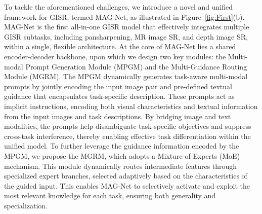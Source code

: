 \documentclass[lettersize,journal]{IEEEtran}
\begin{document}
 
To tackle the aforementioned challenges, we introduce a novel and unified framework for GISR, termed MAG-Net, as illustrated in Figure~\ref{fig:First}(b). MAG-Net is the first all-in-one GISR model that effectively integrates multiple GISR subtasks, including pansharpening, MR image SR, and depth image SR, within a single, flexible architecture.
At the core of MAG-Net lies a shared encoder-decoder backbone, upon which we design two key modules: the Multi-modal Prompt Generation Module (MPGM) and the Multi-Guidance Routing Module (MGRM).
The MPGM dynamically generates task-aware multi-modal prompts by jointly encoding the input image pair and pre-defined textual guidance that encapsulates task-specific description. These prompts act as implicit instructions, encoding both visual characteristics and textual information from the input images and task descriptions. By bridging image and text modalities, the prompts help disambiguate task-specific objectives and suppress cross-task interference, thereby enabling effective task differentiation within the unified model.
To further leverage the guidance information encoded by the MPGM, we propose the MGRM, which adopts a Mixture-of-Experts (MoE) mechanism. This module dynamically routes intermediate features through specialized expert branches, selected adaptively based on the characteristics of the guided input. This enables MAG-Net to selectively activate and exploit the most relevant knowledge for each task, ensuring both generality and specialization.


\end{document}
